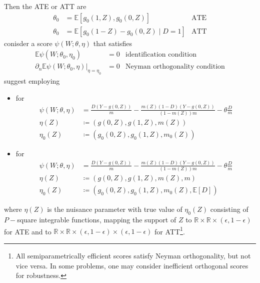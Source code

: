 \documentclass[twoside]{article}
\begin{document}
Then the ATE or ATT are 
\begin{align*}
    \theta_0 &= \mathbb{E}\left[g_0\left(1,Z\right),g_0\left(0,Z\right)\right] & \text{ATE}\\
    \theta_0 &= \mathbb{E}\left[g_0\left(1-Z\right)-g_0\left(0,Z\right)\mid D=1\right] & \text{ATT}
\end{align*}
conisder a score $\psi(W;\theta,\eta)$ that satisfies
\begin{align*}
    \mathbb{E}\psi \left(W;\theta_0,\eta_0\right) &=0 & \text{identification condition}\\
    \left.\partial_n\mathbb{E}\psi \left(W;\theta_0,\eta\right)\right\vert_{\eta=\eta_0} &=0 & \text{Neyman orthogonality condition}
\end{align*}
\citet{chernozhukov2017double} suggest employing 
\begin{itemize}
    \item for 
    \begin{align*}
        \psi\left(W;\theta,\eta\right)&= \frac{D\left(Y-g(0,Z)\right)}{m} - \frac{m(Z)(1-D)\left(Y-g(0,Z)\right)}{\left(1-m(Z)\right)m} - \theta\frac{D}{m} \\
        \eta(Z) &\coloneq \left(g(0,Z),g(1,Z),m(Z)\right)\\
        \eta_0(Z) &\coloneq \left(g_0(0,Z),g_0(1,Z),m_0(Z)\right)
    \end{align*}
    \item for 
    \begin{align*}
        \psi\left(W;\theta,\eta\right) &= \frac{D\left(Y-g(0,Z)\right)}{m} - \frac{m(Z)(1-D)\left(Y-g(0,Z)\right)}{\left(1-m(Z)\right)m} - \theta\frac{D}{m} \\
        \eta(Z) &\coloneq \left(g(0,Z),g(1,Z),m(Z),m\right)\\
        \eta_0(Z) &\coloneq \left(g_0(0,Z),g_0(1,Z),m_0(Z),\mathbb{E}[D]\right)
    \end{align*}
\end{itemize}
where $\eta(Z)$ is the nuisance parameter with true value of $\eta_0(Z)$ consisting of $P-$square integrable functions, mapping the support of $Z$ to $\mathbb{R}\times \mathbb{R} \times\left(\epsilon,1-\epsilon \right)$ for ATE and to $\mathbb{R}\times \mathbb{R} \times\left(\epsilon,1-\epsilon \right) \times\left(\epsilon,1-\epsilon\right)$ for ATT\footnote{All semiparametrically efficient scores satisfy Neyman orthogonality, but not vice versa. In some problems, one may consider inefficient orthogonal scores for robustness.}. 
\end{document}
